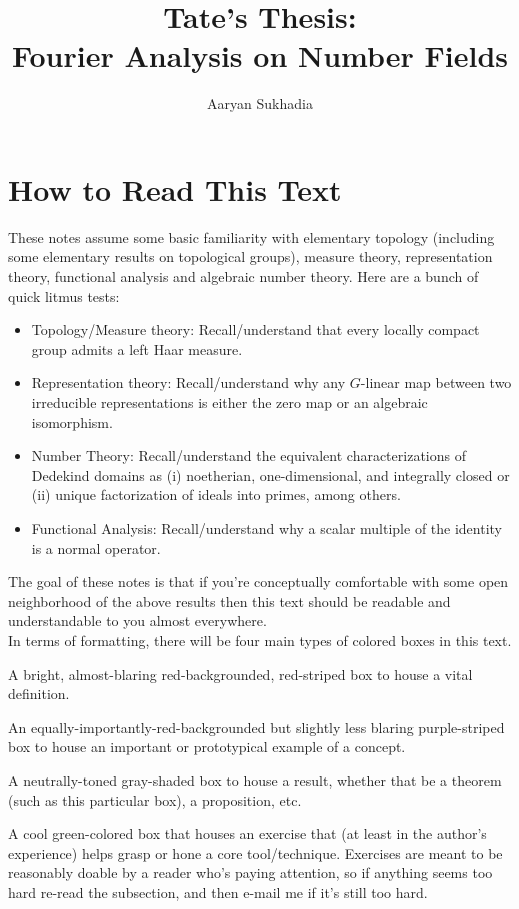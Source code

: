 \documentclass[11pt, x11names]{article}
\begin{document}
\title{Tate's Thesis:\\ Fourier Analysis on Number Fields}

\author{Aaryan Sukhadia}
\date{}

\maketitle
\tableofcontents
\newpage

\section{How to Read This Text}

These notes assume some basic familiarity with elementary topology (including some elementary results on topological groups), measure theory, representation theory, functional analysis and algebraic number theory. Here are a bunch of quick litmus tests:
\begin{itemize}
    \item Topology/Measure theory: Recall/understand that every locally compact group admits a left Haar measure.
    \item Representation theory: Recall/understand why any $G$-linear map between two irreducible representations is either the zero map or an algebraic isomorphism.
    \item Number Theory: Recall/understand the equivalent characterizations of Dedekind domains as (i) noetherian, one-dimensional, and integrally closed or (ii) unique factorization of ideals into primes, among others.
    \item Functional Analysis: Recall/understand why a scalar multiple of the identity is a normal operator.
\end{itemize}
The goal of these notes is that if you're conceptually comfortable with some open neighborhood of the above results then this text should be readable and understandable to you almost everywhere.\\

In terms of formatting, there will be four main types of colored boxes in this text.
\begin{defn} 
    A bright, almost-blaring red-backgrounded, red-striped box to house a vital definition.
\end{defn}
\begin{example}
    An equally-importantly-red-backgrounded but slightly less blaring purple-striped box to house an important or prototypical example of a concept.
\end{example}
\begin{theorem}
    A neutrally-toned gray-shaded box to house a result, whether that be a theorem (such as this particular box), a proposition, etc.
\end{theorem}
\begin{exercise}
    A cool green-colored box that houses an exercise that (at least in the author's experience) helps grasp or hone a core tool/technique. Exercises are meant to be reasonably doable by a reader who's paying attention, so if anything seems too hard re-read the subsection, and then e-mail me if it's still too hard.
\end{exercise}
\end{document}
